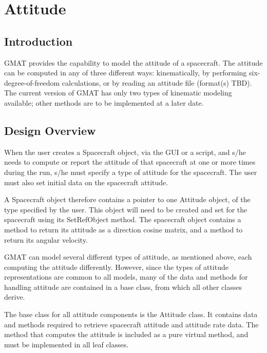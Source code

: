 \chapter{\label{chapter:Attitude}Attitude}

\section{Introduction}

GMAT provides the capability to model the attitude of a spacecraft.  The attitude can be computed in any of three different ways: kinematically, by performing six-degree-of-freedom calculations, or by reading an attitude file (format(s) TBD).  The current version of GMAT has only two types of kinematic modeling available; other methods are to be implemented at a later date.

\section{Design Overview}

When the user creates a Spacecraft object, via the GUI or a script, and s/he needs to compute or report the attitude of that spacecraft at one or more times during the run, s/he must specify a type of attitude for the spacecraft.  The user must also set initial data on the spacecraft attitude.

A Spacecraft object therefore contains a pointer to one Attitude object, of the type specified by the user.  This object will need to be created and set for the spacecraft using its SetRefObject method.  The spacecraft object contains a method to return its attitude as a direction cosine matrix, and a method to return its angular velocity.

GMAT can model several different types of attitude, as mentioned above, each computing the attitude differently.  However, since the types of attitude representations are common to all models, many of the data and methods for handling attitude are contained in a base class, from which all other classes derive.

The base class for all attitude components is the Attitude class.  It contains data and methods required to retrieve spacecraft attitude and attitude rate data.  The method that computes the attitude is included as a pure virtual method, and must be implemented in all leaf classes.

